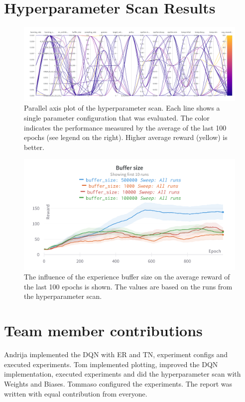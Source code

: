 \documentclass{article}
\begin{document}




\appendix
\section{Hyperparameter Scan Results}
\label{sec:hyperparameter-scan-results}

\begin{figure}[ht!]
   \centering
   \includegraphics[width=\textwidth]{assets/hyperparamter-scan/W&B Chart 3_30_2023, 2 24 25 PM.png}
   \caption{Parallel axis plot of the hyperparameter scan. 
      Each line shows a single parameter configuration that was evaluated. 
      The color indicates the performance measured by the average of the last 100 epochs (see legend on the right). 
      Higher average reward (yellow) is better.
   }
   \label{fig_hyperparameter_scan_parallel_axis}
\end{figure}


\begin{figure}[ht!]
   \centering
   \includegraphics[width=\columnwidth]{assets/hyperparamter-scan/W&B Chart Buffer size.png}
   \caption{The influence of the experience buffer size on the average reward of the last 100 epochs is shown. The values are based on the runs from the hyperparameter scan.
   }
   \label{fig_hyperparameter_scan_isolated_buffer_size}
\end{figure}

\section{Team member contributions}
Andrija implemented the DQN with ER and TN, experiment configs and executed experiments. %
Tom implemented plotting, improved the DQN implementation, executed experiments and did the hyperparameter scan with Weights and Biases.
Tommaso configured the experiments. %
The report was written with equal contribution from everyone.
\end{document}
